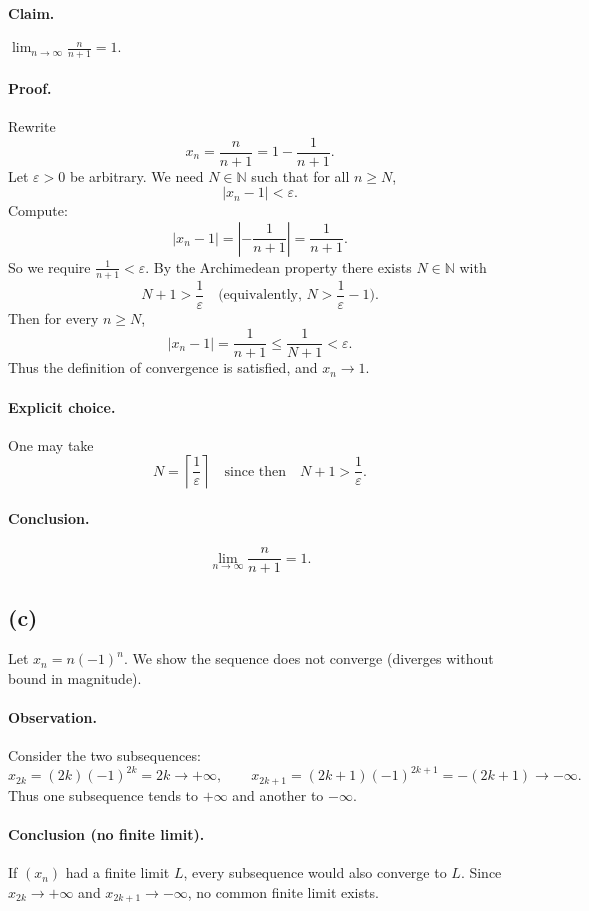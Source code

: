 \documentclass[12pt,a4paper]{article}
\theoremstyle{definition}
\theoremstyle{remark}
\begin{document}
\paragraph{Claim.} \(\displaystyle \lim_{n\to\infty} \frac{n}{n+1} = 1.\)

\paragraph{Proof.}
Rewrite
\[
x_n = \frac{n}{n+1} = 1 - \frac{1}{n+1}.
\]
Let \(\varepsilon>0\) be arbitrary. We need \(N\in\mathbb{N}\) such that for all \(n\ge N\),
\[
\left| x_n - 1 \right| < \varepsilon.
\]
Compute:
\[
\left| x_n - 1 \right| = \left| -\frac{1}{n+1} \right| = \frac{1}{n+1}.
\]
So we require \(\frac{1}{n+1} < \varepsilon\). By the Archimedean property there exists \(N\in\mathbb{N}\) with
\[
N+1 > \frac{1}{\varepsilon} \quad \text{(equivalently, } N > \frac{1}{\varepsilon}-1\text{)}.
\]
Then for every \(n\ge N\),
\[
\left| x_n - 1 \right| = \frac{1}{n+1} \le \frac{1}{N+1} < \varepsilon.
\]
Thus the definition of convergence is satisfied, and \(x_n \to 1\).

\paragraph{Explicit choice.} One may take
\[
N = \left\lceil \frac{1}{\varepsilon} \right\rceil
\quad\text{since then}\quad
N+1 > \frac{1}{\varepsilon}.
\]

\paragraph{Conclusion.}
\[
\boxed{\lim_{n\to\infty} \frac{n}{n+1} = 1.}
\]


\subsection*{(c)}
Let \(x_n = n(-1)^n\). We show the sequence does not converge (diverges without bound in magnitude).

\paragraph{Observation.}
Consider the two subsequences:
\[
x_{2k} = (2k)(-1)^{2k} = 2k \to +\infty,\qquad
x_{2k+1} = (2k+1)(-1)^{2k+1} = -(2k+1) \to -\infty.
\]
Thus one subsequence tends to \(+\infty\) and another to \(-\infty\).

\paragraph{Conclusion (no finite limit).}
If \((x_n)\) had a finite limit \(L\), every subsequence would also converge to \(L\).
Since \(x_{2k}\to +\infty\) and \(x_{2k+1}\to -\infty\), no common finite limit exists.
\end{document}
